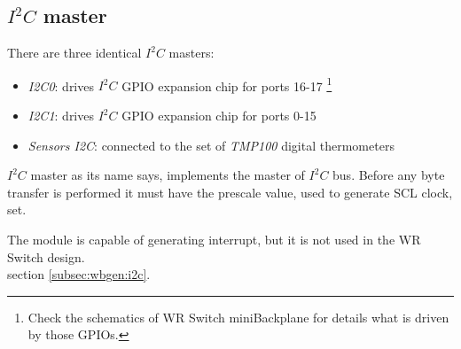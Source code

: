 \subsection{$I^2C$ master}

There are three identical $I^2C$ masters:
\begin{itemize}
  \item \emph{I2C0}: drives $I^2C$ GPIO expansion chip for ports 16-17
    \footnote{Check the schematics of WR Switch miniBackplane for details what
    is driven by those GPIOs.}
  \item \emph{I2C1}: drives $I^2C$ GPIO expansion chip for ports 0-15
  \item \emph{Sensors I2C}: connected to the set of \emph{TMP100} digital
    thermometers
\end{itemize}


$I^2C$ master as its name says, implements the master of $I^2C$ bus. Before any
byte transfer is performed it must have the prescale value, used to
generate SCL clock, set.

The module is capable of generating interrupt, but it is not used in the WR Switch
design.\\

 section \ref{subsec:wbgen:i2c}.
